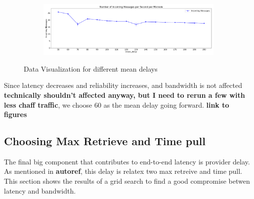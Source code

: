 \documentclass[a4paper,11pt,oneside]{report}
\begin{document}
\begin{figure}[htbp]
\begin{subfigure}{\textwidth}
        \caption{}
        \label{fig:lambdas_bandwidth}
    \end{subfigure}
    \hfill
    \begin{subfigure}{\textwidth}
        \centering
        \includegraphics[width=\textwidth]{plots/delays_incoming_messages.png}
        \caption{}
        \label{fig:lambdas_messages}
    \end{subfigure}
    \caption{Data Visualization for different mean delays}
\end{figure}

Since latency decreases and reliability increases, and bandwidth is not affected \textbf{technically shouldn't affected anyway, but I need to rerun a few with less chaff traffic}, we choose 60 as the mean delay going forward. \textbf{link to figures}

\subsection{Choosing Max Retrieve and Time pull}

The final big component that contributes to end-to-end latency is provider delay. As mentioned in \textbf{autoref}, this delay is relatex two max retreive and time pull. This section shows the results of a grid search to find a good compromise betwen latency and bandwidth.
\end{document}
